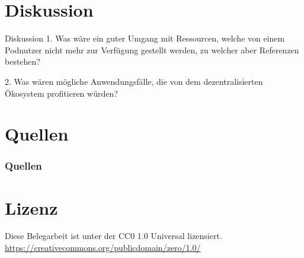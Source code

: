 \documentclass{beamer}              %
\begin{document}
\section{Diskussion}
\begin{frame}{Diskussion}
1. Was wäre ein guter Umgang mit Ressourcen, welche von einem Podnutzer nicht mehr zur Verfügung gestellt werden, zu welcher aber Referenzen bestehen?


2. Was wären mögliche Anwendungsfälle, die von dem dezentralisierten Ökosystem profitieren würden?
\end{frame}

\section{Quellen}
\begin{frame}[allowframebreaks]
        \frametitle{Quellen}
        
        
\end{frame}

\section{Lizenz}
\begin{frame}{}
   \centering Diese Belegarbeit ist unter der CC0 1.0 Universal lizensiert. \url{https://creativecommons.org/publicdomain/zero/1.0/}
\end{frame}
\end{document}
